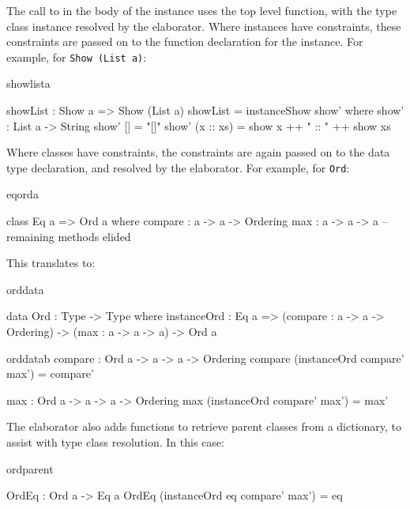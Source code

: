The call to  in the body of the instance uses the top level 
function, with the type class instance resolved by the elaborator.
Where instances have constraints, these constraints are passed on to
the function declaration for the instance. For example, for \texttt{Show (List a)}:

\begin{SaveVerbatim}{showlista}

showList : Show a => Show (List a)
showList = instanceShow show' where
    show' : List a -> String
    show' []        = "[]"
    show' (x :: xs) = show x ++ " :: " ++ show xs

\end{SaveVerbatim}

\noindent
Where classes have constraints, the
constraints are again passed on to the data type declaration, and resolved by the
elaborator. For example, for \texttt{Ord}:

\begin{SaveVerbatim}{eqorda}

class Eq a => Ord a where
    compare : a -> a -> Ordering
    max : a -> a -> a
    -- remaining methods elided

\end{SaveVerbatim}

\noindent
This translates to:

\begin{SaveVerbatim}{orddata}

data Ord : Type -> Type where
    instanceOrd : Eq a => (compare : a -> a -> Ordering) -> 
                          (max : a -> a -> a) ->  Ord a 

\end{SaveVerbatim}

\begin{SaveVerbatim}{orddatab}
compare : Ord a -> a -> a -> Ordering
compare (instanceOrd compare' max') = compare'

max : Ord a -> a -> a -> Ordering
max (instanceOrd compare' max') = max'

\end{SaveVerbatim}


\noindent
The elaborator also adds functions to retrieve parent classes from a dictionary, to assist
with type class resolution. In this case:

\begin{SaveVerbatim}{ordparent}

OrdEq : Ord a -> Eq a
OrdEq (instanceOrd {{eq}} compare' max') = eq

\end{SaveVerbatim}

